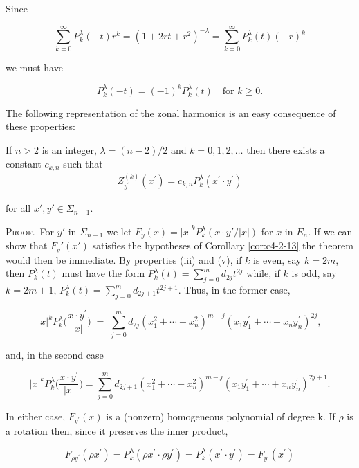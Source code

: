 Since

\[
\sum_{k=0}^{\infty}P_{k}^{\lambda}(-t)r^{k}=(1+2rt+r^{2})^{-\lambda}=\sum_{k=0}^{\infty}P_{k}^{\lambda}(t)(-r)^{k}
\]

we must have

\begin{equation}
\tag{v}
P_{k}^{\lambda}(-t)=(-1)^{k}P_{k}^{\lambda}(t)\quad\text{for }k\geq0.
\end{equation}

The following representation of the zonal harmonics is an easy consequence of these properties:

\begin{theorem}
\label{thm:c4-2-14}
If $n > 2$ is an integer, $\lambda = (n - 2)/2$ and $k = 0, 1, 2, \ldots$ then there exists a constant $c_{k,n}$ such that
\[
\begin{array}{r}{Z_{y^{\prime}}^{(k)}(x^{\prime})=c_{k,n}P_{k}^{\lambda}(x^{\prime}{\cdot}y^{\prime})}\end{array}
\]

for all $x', y' \in \Sigma_{n-1}$.
\end{theorem}

\textsc{Proof.}\ For $y'$ in $\Sigma_{n-1}$ we let $F_y(x) = |x|^{k}P_k^\lambda(x \cdot y'/|x|)$ for $x$ in $E_n$. If we can show that $F_y'(x')$ satisfies the hypotheses of Corollary \ref{cor:c4-2-13} the theorem would then be immediate. By properties (iii) and (v), if $k$ is even, say $k = 2m$, then $P_k^\lambda(t)$ must have the form $P_k^\lambda(t) = \sum_{j=0}^{m} d_{2j} t^{2j}$ while, if $k$ is odd, say $k = 2m + 1$, $P_k^\lambda(t) = \sum_{j=0}^{m} d_{2j+1} t^{2j+1}$. Thus, in the former case,

\[
|x|^{k}P_{k}^{\lambda}\biggl(\frac{x\cdot y^{\prime}}{|x|}\biggr)\;=\;\sum_{j=0}^{m}d_{2j}(x_{1}^{2}+\cdots+x_{n}^{2})^{m-j}(x_{1}y_{1}^{\prime}+\cdots+x_{n}y_{n}^{\prime})^{2j},
\]

and, in the second case

\[
|x|^{k}P_{k}^{\lambda}\biggl(\frac{x\cdot y^{\prime}}{|x|}\biggr)=\sum_{j=0}^{m}d_{2j+1}(x_{1}^{2}+\cdots+x_{n}^{2})^{m-j}(x_{1}y_{1}^{\prime}+\cdots+x_{n}y_{n}^{\prime})^{2j+1}.
\]

In either case, $F_{y^{\prime}}(x)$ is a (nonzero) homogeneous polynomial of degree k. If $\rho$ is a rotation then, since it preserves the inner product,

\[
F_{\rho y^{\prime}}(\rho x^{\prime})=P_{k}^{\lambda}(\rho x^{\prime}\cdot\rho y^{\prime})=P_{k}^{\lambda}(x^{\prime}\cdot y^{\prime})=F_{y^{\prime}}(x^{\prime})
\]

